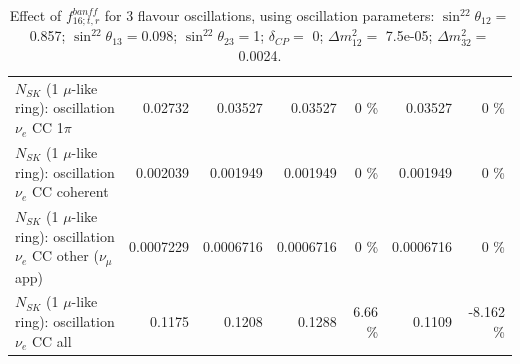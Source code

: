 \begin{table}
\begin{tabular}{| l | r | r | r  r | r  r |}
                     $N_{SK}$ (1 $\mu$-like ring): oscillation $\nu_e$ CC 1$\pi$ &         0.02732 &         0.03527 &         0.03527 &        0 \%  &         0.03527 &        0 \%  \\ 
                   $N_{SK}$ (1 $\mu$-like ring): oscillation $\nu_e$ CC coherent &        0.002039 &        0.001949 &        0.001949 &        0 \%  &        0.001949 &        0 \%  \\ 
      $N_{SK}$ (1 $\mu$-like ring): oscillation $\nu_e$ CC other ($\nu_\mu$ app) &       0.0007229 &       0.0006716 &       0.0006716 &        0 \%  &       0.0006716 &        0 \%  \\ 
                       $N_{SK}$ (1 $\mu$-like ring): oscillation $\nu_e$  CC all &          0.1175 &          0.1208 &          0.1288 &     6.66 \%  &          0.1109 &   -8.162 \%  \\ 
\hline
\hline
\end{tabular}
\caption{ Effect of $f_{16; t, r}^{banff}$ for 3 flavour oscillations, using oscillation parameters:  $\sin^22\theta_{12} = $0.857; $\sin^22\theta_{13} = $0.098; $\sin^22\theta_{23} = $1; $\delta_{CP} = $        0; $\Delta m^2_{12} = $    7.5e-05; $\Delta m^2_{32} = $    0.0024. }
\label{tab:num_banff_maqe_1RmuT_3f_osc_t13:0.098}
\end{table}
\clearpage
